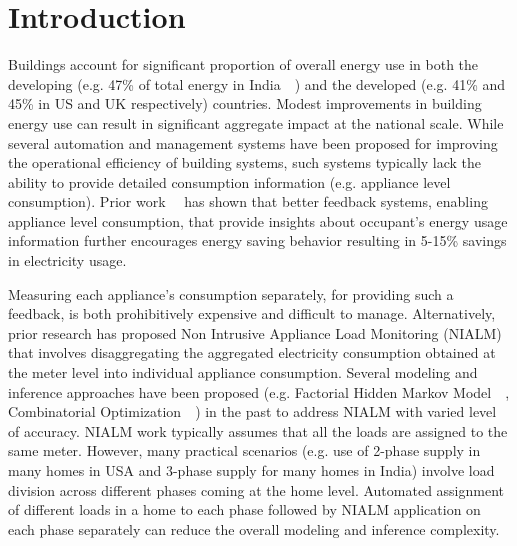 \documentclass[conference]{IEEEtran}
\begin{document}
\section{Introduction}
\noindent Buildings account for significant proportion of overall energy use in both the developing (e.g. 47\% of total energy in India~~\cite{evans09}) and the developed (e.g. 41\% and 45\% in US and UK respectively) countries. Modest improvements in building energy use can result in significant aggregate impact at the national scale. While several automation and management systems have been proposed for improving the operational efficiency of building systems, such systems typically lack the ability to provide detailed consumption information (e.g. appliance level consumption). Prior work~~\cite{darby} has shown that better feedback systems, enabling appliance level consumption, that provide insights about occupant's energy usage information further encourages energy saving behavior resulting in 5-15\% savings in electricity usage.

\noindent Measuring each appliance's consumption separately, for providing such a feedback, is both prohibitively expensive and difficult to manage. Alternatively, prior research has proposed Non Intrusive Appliance Load Monitoring (NIALM) that involves disaggregating the aggregated electricity consumption obtained at the meter level into individual appliance consumption. Several modeling and inference approaches have been proposed (e.g. Factorial Hidden Markov Model~~\cite{Ghahramani_97a}, Combinatorial Optimization~~\cite{hart}) in the past to address NIALM with varied level of accuracy. NIALM work typically assumes that all the loads are assigned to the same meter. However, many practical scenarios (e.g. use of 2-phase supply in many homes in USA and 3-phase supply for many homes in India) involve load division across different phases coming at the home level. Automated assignment of different loads in a home to each phase followed by NIALM application on each phase separately can reduce the overall modeling and inference complexity. 
\end{document}
